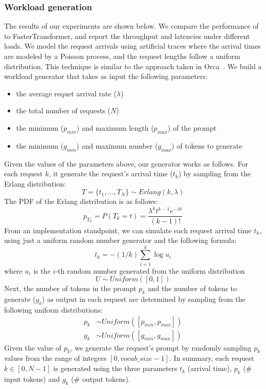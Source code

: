 \subsubsection{Workload generation}
The results of our experiments are shown below. We compare the performance of \Project to FasterTransformer, and report the throughput and latencies under different loads. We model the request arrivals using artificial traces where the arrival times are modeled by a Poisson process, and the request lengths follow a uniform distribution. This technique is similar to the approach taken in Orca~\cite{orca}. We build a workload generator that takes as input the following parameters:
\begin{itemize}
    \item the average requet arrival rate ($\lambda$)
    \item the total number of requests ($N$)
    \item the minimum ($p_{min}$) and maximum length ($p_{max}$) of the prompt
    \item the minimum ($g_{min}$) and maximum number ($g_{max}$) of tokens to generate
\end{itemize}
Given the values of the parameters above, our generator works as follows. For each request $k$, it generate the request's arrival time ($t_k$) by sampling from the Erlang distribution:
\begin{equation}
    T=\{t_1,..., T_N\} \sim Erlang(k, \lambda)
\end{equation}
The PDF of the Erlang distribution is as follows: 
\begin{equation}
    p_{T_k} = P(T_k=t)=\frac{\lambda^kt^{k-1}e^{-\lambda t}}{(k-1)!}
\end{equation}
From an implementation standpoint, we can simulate each request arrival time $t_k$, using just a uniform random number generator and the following formula: 
\begin{equation}
    t_k=-(1/k)\sum_{i=1}^k\log{u_i}
\end{equation}
where $u_i$ is the $i$-th random number generated from the uniform distribution 
\begin{equation}
    U \sim Uniform([0,1])
\end{equation}
Next, the number of tokens in the prompt $p_k$ and the number of tokens to generate ($g_k$) as output in each request are determined by sampling from the following uniform distributions:
\begin{align}
    p_k & \sim Uniform([p_{min}, p_{max}]) \\
    g_k & \sim Uniform([g_{min}, g_{max}])
\end{align}
Given the value of $p_k$, we generate the request's prompt by randomly sampling $p_k$ values from the range of integers $[0, vocab\_size -1]$.
In summary, each request $k \in [0, N-1]$ is generated using the three parameters $t_k$ (arrival time), $p_k$ (\# input tokens) and $g_k$ (\# output tokens). 
